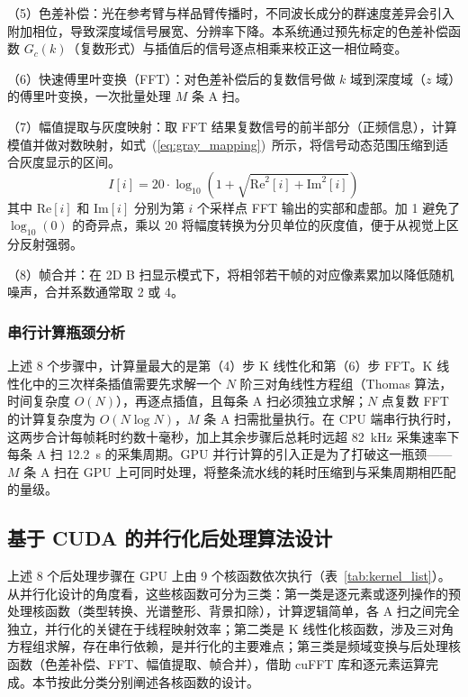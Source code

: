 （5）色差补偿：光在参考臂与样品臂传播时，不同波长成分的群速度差异会引入附加相位，导致深度域信号展宽、分辨率下降。本系统通过预先标定的色差补偿函数 $G_c(k)$（复数形式）与插值后的信号逐点相乘来校正这一相位畸变。

（6）快速傅里叶变换（FFT）：对色差补偿后的复数信号做 $k$ 域到深度域（$z$ 域）的傅里叶变换，一次批量处理 $M$ 条 A 扫。

（7）幅值提取与灰度映射：取 FFT 结果复数信号的前半部分（正频信息），计算模值并做对数映射，如式~(\ref{eq:gray_mapping})~所示，将信号动态范围压缩到适合灰度显示的区间。
\begin{equation}
I[i] = 20 \cdot \log_{10}\!\left(1 + \sqrt{\mathrm{Re}^2[i] + \mathrm{Im}^2[i]}\right)
\label{eq:gray_mapping}
\end{equation}
其中 $\mathrm{Re}[i]$ 和 $\mathrm{Im}[i]$ 分别为第 $i$ 个采样点 FFT 输出的实部和虚部。加 1 避免了 $\log_{10}(0)$ 的奇异点，乘以 20 将幅度转换为分贝单位的灰度值，便于从视觉上区分反射强弱。

（8）帧合并：在 2D B 扫显示模式下，将相邻若干帧的对应像素累加以降低随机噪声，合并系数通常取 2 或 4。

\subsubsection{串行计算瓶颈分析}

上述 8 个步骤中，计算量最大的是第（4）步 K 线性化和第（6）步 FFT。K 线性化中的三次样条插值需要先求解一个 $N$ 阶三对角线性方程组（Thomas 算法，时间复杂度 $O(N)$），再逐点插值，且每条 A 扫必须独立求解；$N$ 点复数 FFT 的计算复杂度为 $O(N \log N)$，$M$ 条 A 扫需批量执行。在 CPU 端串行执行时，这两步合计每帧耗时约数十毫秒，加上其余步骤后总耗时远超 82~kHz 采集速率下每条 A 扫 12.2~\textmu s 的采集周期。GPU 并行计算的引入正是为了打破这一瓶颈——$M$ 条 A 扫在 GPU 上可同时处理，将整条流水线的耗时压缩到与采集周期相匹配的量级。

\subsection{基于 CUDA 的并行化后处理算法设计}\label{sec:cuda_design}

上述 8 个后处理步骤在 GPU 上由 9 个核函数依次执行（表~\ref{tab:kernel_list}）。从并行化设计的角度看，这些核函数可分为三类：第一类是逐元素或逐列操作的预处理核函数（类型转换、光谱整形、背景扣除），计算逻辑简单，各 A 扫之间完全独立，并行化的关键在于线程映射效率；第二类是 K 线性化核函数，涉及三对角方程组求解，存在串行依赖，是并行化的主要难点；第三类是频域变换与后处理核函数（色差补偿、FFT、幅值提取、帧合并），借助 cuFFT 库和逐元素运算完成。本节按此分类分别阐述各核函数的设计。

